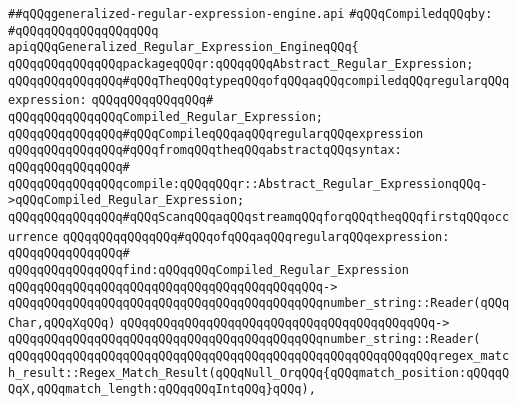 \label{src/lib/regex/backend/generalized-regular-expression-engine.api}
\verb|##qQQqgeneralized-regular-expression-engine.api|\newline
\newline
\verb|#qQQqCompiledqQQqby:|\newline
\verb|#qQQqqQQqqQQqqQQqqQQq|\newline
\newline
\verb|apiqQQqGeneralized_Regular_Expression_EngineqQQq{|\newline
\newline
\verb|qQQqqQQqqQQqqQQqpackageqQQqr:qQQqqQQqAbstract_Regular_Expression;|\newline
\newline
\verb|qQQqqQQqqQQqqQQq#qQQqTheqQQqtypeqQQqofqQQqaqQQqcompiledqQQqregularqQQqexpression:|\newline
\verb|qQQqqQQqqQQqqQQq#|\newline
\verb|qQQqqQQqqQQqqQQqCompiled_Regular_Expression;|\newline
\newline
\verb|qQQqqQQqqQQqqQQq#qQQqCompileqQQqaqQQqregularqQQqexpression|\newline
\verb|qQQqqQQqqQQqqQQq#qQQqfromqQQqtheqQQqabstractqQQqsyntax:|\newline
\verb|qQQqqQQqqQQqqQQq#|\newline
\verb|qQQqqQQqqQQqqQQqcompile:qQQqqQQqr::Abstract_Regular_ExpressionqQQq->qQQqCompiled_Regular_Expression;|\newline
\newline
\verb|qQQqqQQqqQQqqQQq#qQQqScanqQQqaqQQqstreamqQQqforqQQqtheqQQqfirstqQQqoccurrence|\newline
\verb|qQQqqQQqqQQqqQQq#qQQqofqQQqaqQQqregularqQQqexpression:|\newline
\verb|qQQqqQQqqQQqqQQq#|\newline
\verb|qQQqqQQqqQQqqQQqfind:qQQqqQQqCompiled_Regular_Expression|\newline
\verb|qQQqqQQqqQQqqQQqqQQqqQQqqQQqqQQqqQQqqQQqqQQq->|\newline
\verb|qQQqqQQqqQQqqQQqqQQqqQQqqQQqqQQqqQQqqQQqqQQqnumber_string::Reader(qQQqChar,qQQqXqQQq)|\newline
\verb|qQQqqQQqqQQqqQQqqQQqqQQqqQQqqQQqqQQqqQQqqQQq->|\newline
\verb|qQQqqQQqqQQqqQQqqQQqqQQqqQQqqQQqqQQqqQQqqQQqnumber_string::Reader(|\newline
\verb|qQQqqQQqqQQqqQQqqQQqqQQqqQQqqQQqqQQqqQQqqQQqqQQqqQQqqQQqqQQqregex_match_result::Regex_Match_Result(qQQqNull_OrqQQq{qQQqmatch_position:qQQqqQQqX,qQQqmatch_length:qQQqqQQqIntqQQq}qQQq),|\newline
